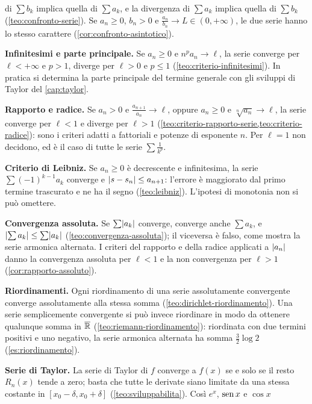 \begin{puntichiave}
di $\sum b_{k}$ implica quella di $\sum a_{k}$, e la divergenza di $\sum a_{k}$ implica quella di
$\sum b_{k}$ (\cref{teo:confronto-serie}). Se $a_{n}\ge0$, $b_{n}>0$ e
$\frac{a_{n}}{b_{n}}\to L\in(0,+\infty)$, le due serie hanno lo stesso carattere
(\cref{cor:confronto-asintotico}).
\item \textbf{Infinitesimi e parte principale.} Se $a_{n}\ge0$ e $n^{p}a_{n}\to\ell$, la serie
converge per $\ell<+\infty$ e $p>1$, diverge per $\ell>0$ e $p\le1$
(\cref{teo:criterio-infinitesimi}). In pratica si determina la parte principale del
termine generale con gli sviluppi di Taylor del \cref{cap:taylor}.
\item \textbf{Rapporto e radice.} Se $a_{n}>0$ e $\frac{a_{n+1}}{a_{n}}\to\ell$, oppure $a_{n}\ge0$ e
$\sqrt[n]{a_{n}}\to\ell$, la serie converge per $\ell<1$ e diverge per $\ell>1$
(\cref{teo:criterio-rapporto-serie,teo:criterio-radice}): sono i criteri adatti a
fattoriali e potenze di esponente $n$. Per $\ell=1$ non decidono, ed è il caso di tutte le
serie $\sum\frac1{k^{p}}$.
\item \textbf{Criterio di Leibniz.} Se $a_{n}\ge0$ è decrescente e infinitesima, la serie
$\sum(-1)^{k-1}a_{k}$ converge e $\lvert s-s_{n}\rvert\le a_{n+1}$: l'errore è maggiorato dal primo
termine trascurato e ne ha il segno (\cref{teo:leibniz}). L'ipotesi di monotonia non si
può omettere.
\item \textbf{Convergenza assoluta.} Se $\sum\lvert a_{k}\rvert$ converge, converge anche $\sum a_{k}$, e
$\lvert \sum a_{k}\rvert\le\sum\lvert a_{k}\rvert$ (\cref{teo:convergenza-assoluta}); il viceversa è falso, come
mostra la serie armonica alternata. I criteri del rapporto e della radice applicati a
$\lvert a_{n}\rvert$ danno la convergenza assoluta per $\ell<1$ e la non convergenza per $\ell>1$
(\cref{cor:rapporto-assoluto}).
\item \textbf{Riordinamenti.} Ogni riordinamento di una serie assolutamente convergente
converge assolutamente alla stessa somma (\cref{teo:dirichlet-riordinamento}). Una serie
semplicemente convergente si può invece riordinare in modo da ottenere qualunque somma
in $\overline{\mathbb{R}}$ (\cref{teo:riemann-riordinamento}): riordinata con due termini positivi e
uno negativo, la serie armonica alternata ha somma $\frac32\log2$ (\cref{es:riordinamento}).
\item \textbf{Serie di Taylor.} La serie di Taylor di $f$ converge a $f(x)$ se e solo se il
resto $R_{n}(x)$ tende a zero; basta che tutte le derivate siano limitate da una stessa
costante in $[x_{0}-\delta,x_{0}+\delta]$ (\cref{teo:sviluppabilita}). Così $e^{x}$, $\operatorname{sen} x$ e $\cos x$

\end{puntichiave}
